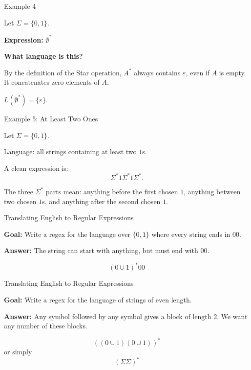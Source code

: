 \documentclass[10pt,aspectratio=169]{beamer}
\newcommand{\eps}{\varepsilon}
\begin{document}
\begin{frame}{Example 4}

Let $\Sigma = \{0, 1\}$.

\vspace{1em}

\textbf{Expression:} $\emptyset^*$

\vspace{1em}

\textbf{What language is this?}

\pause
\vspace{0.5em}
By the definition of the Star operation, $A^*$ always contains $\eps$, even if $A$ is empty. It concatenates zero elements of $A$.

\vspace{1em}
$L(\emptyset^*) = \{\eps\}$.

\end{frame}


\begin{frame}{Example 5: At Least Two Ones}

Let $\Sigma=\{0,1\}$.

\vspace{0.8em}
Language: all strings containing at least two $1$s.

\vspace{0.8em}
\pause
A clean expression is:
\[
\Sigma^*1\Sigma^*1\Sigma^*.
\]

\vspace{0.8em}
The three $\Sigma^*$ parts mean: anything before the first chosen $1$, anything between two chosen $1$s, and anything after the second chosen $1$.

\end{frame}

\begin{frame}{Translating English to Regular Expressions}

\textbf{Goal:} Write a regex for the language over $\{0,1\}$ where every string ends in $00$.

\vspace{1em}
\pause
\textbf{Answer:} 
The string can start with anything, but must end with $00$.

$$ (0 \cup 1)^* 00 $$

\end{frame}

\begin{frame}{Translating English to Regular Expressions}

\textbf{Goal:} Write a regex for the language of strings of even length.

\vspace{1em}
\pause
\textbf{Answer:} 
Any symbol followed by any symbol gives a block of length 2. We want any number of these blocks.

$$ ((0 \cup 1)(0 \cup 1))^* $$
or simply
$$ (\Sigma\Sigma)^* $$

\end{frame}
\end{document}

